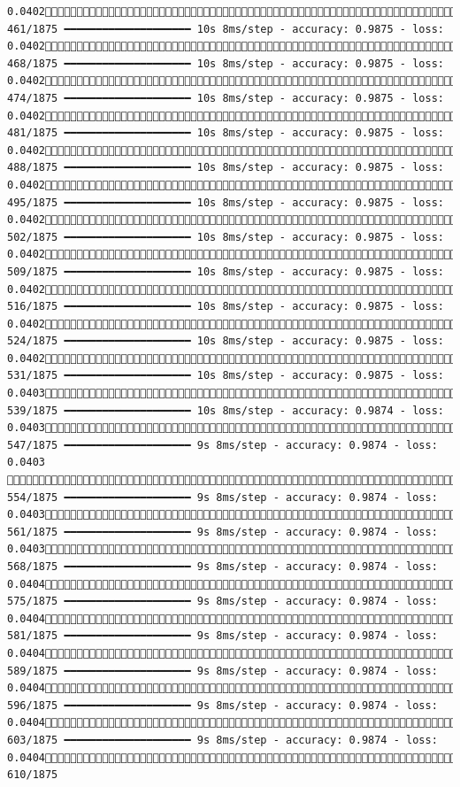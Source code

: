 \documentclass[
  letterpaper,
  DIV=11,
  numbers=noendperiod]{scrreprt}
\begin{document}
\begin{verbatim}
0.0402 461/1875 ━━━━━━━━━━━━━━━━━━━━ 10s 8ms/step - accuracy: 0.9875 - loss: 0.0402 468/1875 ━━━━━━━━━━━━━━━━━━━━ 10s 8ms/step - accuracy: 0.9875 - loss: 0.0402 474/1875 ━━━━━━━━━━━━━━━━━━━━ 10s 8ms/step - accuracy: 0.9875 - loss: 0.0402 481/1875 ━━━━━━━━━━━━━━━━━━━━ 10s 8ms/step - accuracy: 0.9875 - loss: 0.0402 488/1875 ━━━━━━━━━━━━━━━━━━━━ 10s 8ms/step - accuracy: 0.9875 - loss: 0.0402 495/1875 ━━━━━━━━━━━━━━━━━━━━ 10s 8ms/step - accuracy: 0.9875 - loss: 0.0402 502/1875 ━━━━━━━━━━━━━━━━━━━━ 10s 8ms/step - accuracy: 0.9875 - loss: 0.0402 509/1875 ━━━━━━━━━━━━━━━━━━━━ 10s 8ms/step - accuracy: 0.9875 - loss: 0.0402 516/1875 ━━━━━━━━━━━━━━━━━━━━ 10s 8ms/step - accuracy: 0.9875 - loss: 0.0402 524/1875 ━━━━━━━━━━━━━━━━━━━━ 10s 8ms/step - accuracy: 0.9875 - loss: 0.0402 531/1875 ━━━━━━━━━━━━━━━━━━━━ 10s 8ms/step - accuracy: 0.9875 - loss: 0.0403 539/1875 ━━━━━━━━━━━━━━━━━━━━ 10s 8ms/step - accuracy: 0.9874 - loss: 0.0403 547/1875 ━━━━━━━━━━━━━━━━━━━━ 9s 8ms/step - accuracy: 0.9874 - loss: 0.0403  554/1875 ━━━━━━━━━━━━━━━━━━━━ 9s 8ms/step - accuracy: 0.9874 - loss: 0.0403 561/1875 ━━━━━━━━━━━━━━━━━━━━ 9s 8ms/step - accuracy: 0.9874 - loss: 0.0403 568/1875 ━━━━━━━━━━━━━━━━━━━━ 9s 8ms/step - accuracy: 0.9874 - loss: 0.0404 575/1875 ━━━━━━━━━━━━━━━━━━━━ 9s 8ms/step - accuracy: 0.9874 - loss: 0.0404 581/1875 ━━━━━━━━━━━━━━━━━━━━ 9s 8ms/step - accuracy: 0.9874 - loss: 0.0404 589/1875 ━━━━━━━━━━━━━━━━━━━━ 9s 8ms/step - accuracy: 0.9874 - loss: 0.0404 596/1875 ━━━━━━━━━━━━━━━━━━━━ 9s 8ms/step - accuracy: 0.9874 - loss: 0.0404 603/1875 ━━━━━━━━━━━━━━━━━━━━ 9s 8ms/step - accuracy: 0.9874 - loss: 0.0404 610/1875 
\end{verbatim}
\end{document}
